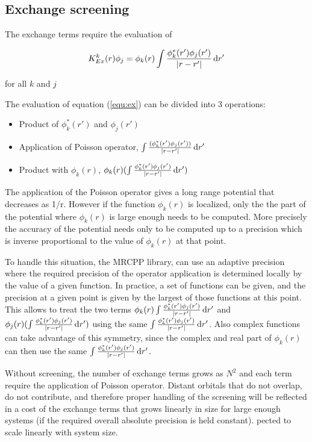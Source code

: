 \documentclass{article}
\begin{document}

\subsection{Exchange screening}
\label{Xscreen}

The exchange terms require the evaluation of

\begin{equation}
\label{equ:ex}
  K_{Ex}^k(r) \phi_j = \phi_k(r) \int \frac{\phi^*_k(r')\phi_j(r')}{|r-r'|} \,\mathrm{d} r'
\end{equation}

 for all $k$ and $j$

The evaluation of equation (\ref{equ:ex}) can be divided into 3 operations:
\begin{itemize}
\item Product of $\phi^*_k(r')$ and $\phi_j(r')$
\item Application of Poisson operator, $\int \frac{(\phi^*_k(r')\phi_j(r'))}{|r-r'|} \,\mathrm{d} r'$
\item Product with $\phi_k(r)$, $\phi_k(r) (\int \frac{\phi^*_k(r')\phi_j(r')}{|r-r'|} \,\mathrm{d} r')$
\end{itemize}

The application of the Poisson operator gives a long range potential that decreases as 1/r. However if the function $\phi_k(r)$ is localized, only the the part of the potential where $\phi_k(r)$ is large enough needs to be computed. More precisely the accuracy of the potential needs only to be computed up to a precision which is inverse proportional to the value of $\phi_k(r)$ at that point. 

To handle this situation, the MRCPP library, can use an adaptive precision where the required precision of the operator application is determined locally by the value of a given function. In practice, a set of functions can be given, and the precision at a given point is given by the largest of those functions at this point. This allows to treat the two terms $\phi_k(r) \int \frac{\phi^*_k(r')\phi_j(r')}{|r-r'|} \,\mathrm{d} r'$ and  $\phi_j(r) (\int \frac{\phi^*_k(r')\phi_j(r')}{|r-r'|} \,\mathrm{d} r')$ using the same $\int \frac{\phi^*_k(r')\phi_j(r')}{|r-r'|} \,\mathrm{d} r'$.  Also complex functions can take advantage of this symmetry, since the complex and real part of $\phi_k(r)$ can then use the same $\int \frac{\phi^*_k(r')\phi_j(r')}{|r-r'|} \,\mathrm{d} r'$.

Without screening, the number of exchange terms grows as $N^2$ and each term require the application of Poisson operator. Distant orbitals that do not overlap, do not contribute, and therefore proper handling of the screening will be reflected in a cost of the exchange terms that grows linearly in size for large enough systems (if the required overall absolute precision is held constant).
pected to scale linearly with system size.
\end{document}
